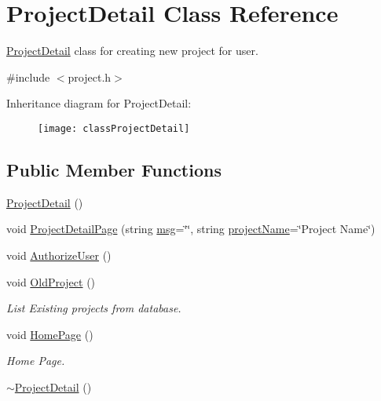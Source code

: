 \hypertarget{classProjectDetail}{\section{Project\-Detail Class Reference}
\label{classProjectDetail}
}


\hyperlink{classProjectDetail}{Project\-Detail} class for creating new project for user.  




{\ttfamily \#include $<$project.\-h$>$}

Inheritance diagram for Project\-Detail\-:\begin{figure}[H]
\begin{center}
\leavevmode
\texttt{[image: classProjectDetail]}
\end{center}
\end{figure}
\subsection*{Public Member Functions}
\begin{DoxyCompactItemize}
\item 
\hyperlink{classProjectDetail_a405e8bbc157e30c4ff93871988218d9f}{Project\-Detail} ()
\item 
void \hyperlink{classProjectDetail_a581ccdab5dcd21663b78ebedbbf0d240}{Project\-Detail\-Page} (string \hyperlink{classInputDetail_a1abb16cd695678c3fa05e3c812823fee}{msg}=\char`\"{}\char`\"{}, string \hyperlink{classInputDetail_aaaf51475a2a4ddbe34e38c96bdb45bad}{project\-Name}=\char`\"{}Project Name\char`\"{})
\item 
void \hyperlink{classProjectDetail_ab78c9e2a0cd5079c427638a5a3971c28}{Authorize\-User} ()
\item 
void \hyperlink{classProjectDetail_ab92c992a37524a5f90fdcaf4868ac218}{Old\-Project} ()
\begin{DoxyCompactList}\small\item\em List Existing projects from database. \end{DoxyCompactList}\item 
void \hyperlink{classProjectDetail_aa36fe7134da17688018870ae8ebf2191}{Home\-Page} ()
\begin{DoxyCompactList}\small\item\em Home Page. \end{DoxyCompactList}\item 
\hyperlink{classProjectDetail_ab4719d14d9efb8811916f5d691099c8f}{$\sim$\-Project\-Detail} ()
\end{DoxyCompactItemize}
